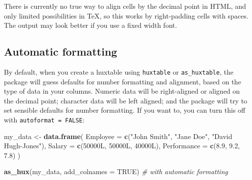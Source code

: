 \documentclass[]{article}
\newenvironment{Shaded}{\begin{snugshade}}{\end{snugshade}}
\newcommand{\CommentTok}[1]{\textcolor[rgb]{0.56,0.35,0.01}{\textit{#1}}}
\newcommand{\DataTypeTok}[1]{\textcolor[rgb]{0.13,0.29,0.53}{#1}}
\newcommand{\FloatTok}[1]{\textcolor[rgb]{0.00,0.00,0.81}{#1}}
\newcommand{\KeywordTok}[1]{\textcolor[rgb]{0.13,0.29,0.53}{\textbf{#1}}}
\newcommand{\NormalTok}[1]{#1}
\newcommand{\OtherTok}[1]{\textcolor[rgb]{0.56,0.35,0.01}{#1}}
\newcommand{\StringTok}[1]{\textcolor[rgb]{0.31,0.60,0.02}{#1}}
\begin{document}
There is currently no true way to align cells by the decimal point in
HTML, and only limited possibilities in TeX, so this works by
right-padding cells with spaces. The output may look better if you use a
fixed width font.

\hypertarget{automatic-formatting}{%
\subsection{Automatic formatting}\label{automatic-formatting}}

By default, when you create a huxtable using \texttt{huxtable} or
\texttt{as\_huxtable}, the package will guess defaults for number
formatting and alignment, based on the type of data in your columns.
Numeric data will be right-aligned or aligned on the decimal point;
character data will be left aligned; and the package will try to set
sensible defaults for number formatting. If you want to, you can turn
this off with \texttt{autoformat\ =\ FALSE}:

\begin{Shaded}
\begin{Highlighting}[]
\NormalTok{my_data <-}\StringTok{ }\KeywordTok{data.frame}\NormalTok{(}
        \DataTypeTok{Employee    =} \KeywordTok{c}\NormalTok{(}\StringTok{"John Smith"}\NormalTok{, }\StringTok{"Jane Doe"}\NormalTok{, }\StringTok{"David Hugh-Jones"}\NormalTok{), }
        \DataTypeTok{Salary      =} \KeywordTok{c}\NormalTok{(50000L, 50000L, 40000L),}
        \DataTypeTok{Performance =} \KeywordTok{c}\NormalTok{(}\FloatTok{8.9}\NormalTok{, }\FloatTok{9.2}\NormalTok{, }\FloatTok{7.8}\NormalTok{)  }
\NormalTok{      )}

\KeywordTok{as_hux}\NormalTok{(my_data, }\DataTypeTok{add_colnames =} \OtherTok{TRUE}\NormalTok{) }\CommentTok{# with automatic formatting}
\end{Highlighting}
\end{Shaded}

 
  \providecommand{\huxb}[2]{\arrayrulecolor[RGB]{#1}\global\arrayrulewidth=#2pt}
  \providecommand{\huxvb}[2]{\color[RGB]{#1}\vrule width #2pt}
  \providecommand{\huxtpad}[1]{\rule{0pt}{\baselineskip+#1}}
  \providecommand{\huxbpad}[1]{\rule[-#1]{0pt}{#1}}
\end{document}
